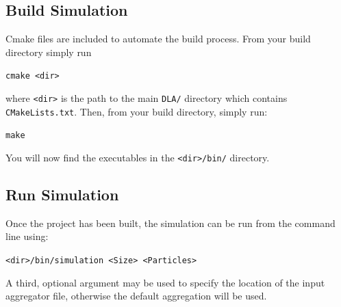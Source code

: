 \documentclass[fleqn,10pt]{SelfArx} %
\begin{document}
\subsection{Build Simulation}
Cmake files are included to automate the build process. From your build directory simply run
\begin{center}
    \texttt{cmake <dir>}
\end{center}
where \texttt{<dir>} is the path to the main \texttt{DLA/} directory which contains \texttt{CMakeLists.txt}. 
Then, from your build directory, simply run:
\begin{center}
    \texttt{make}
\end{center}
You will now find the executables in the \texttt{<dir>/bin/} directory.
\subsection{Run Simulation}
Once the project has been built, the simulation can be run from the command line using:
\begin{center}
    \texttt{<dir>/bin/simulation <Size> <Particles>}
\end{center}
A third, optional argument may be used to specify the location of the input aggregator file, otherwise the default aggregation will be used.
\end{document}
